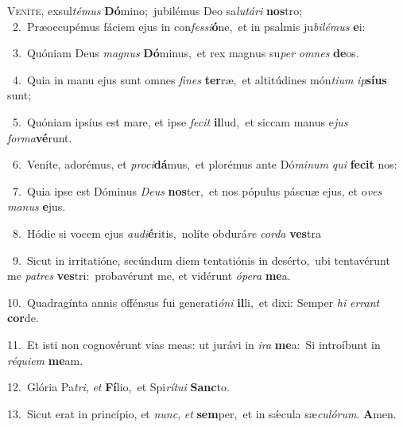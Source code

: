 \lettrine{\initial\textcolor{\initialcolor}{V}}{eníte,} exsul\-\textit{té}\-\textit{mus} \textbf{Dó}\-mino;~\star jubilémus Deo sa\-\textit{lu}\-\textit{tá}\textit{ri} \textbf{nos}\-tro;\\
{\numbfont\textcolor{\numbcolor}{~2.}}~Præoccupémus fáciem ejus in con\-\textit{fes}\-\textit{si}\textbf{ó}ne,~\star et in psalmis ju\-\textit{bi}\-\textit{lé}\textit{mus} \textbf{e}\-i:\par
{\numbfont\textcolor{\numbcolor}{~3.}}~Quóniam Deus \textit{ma}\-\textit{gnus} \textbf{Dó}\-minus,~\star et rex magnus su\textit{per} \textit{om}\-\textit{nes} \textbf{de}\-os.\par
{\numbfont\textcolor{\numbcolor}{~4.}}~Quia in manu ejus sunt omnes \textit{fi}\-\textit{nes} \textbf{ter}\-ræ,~\star et altitúdines món\-\textit{ti}\-\textit{um} \textit{ip}\-\textbf{sí}\textbf{us} sunt;\par
{\numbfont\textcolor{\numbcolor}{~5.}}~Quóniam ipsíus est mare, et ipse \textit{fe}\-\textit{cit} \textbf{il}\-lud,~\star et siccam manus e\textit{jus} \textit{for}\-\textit{ma}\textbf{vé}runt.\par
{\numbfont\textcolor{\numbcolor}{~6.}}~Veníte, adorémus, et \textit{pro}\-\textit{ci}\textbf{dá}mus,~\star et plorémus ante Dó\-\textit{mi}\-\textit{num} \textit{qui} \textbf{fe}\-\textbf{cit} nos:\par
{\numbfont\textcolor{\numbcolor}{~7.}}~Quia ipse est Dóminus \textit{De}\-\textit{us} \textbf{nos}\-ter,~\star et nos pópulus páscuæ ejus, et o\textit{ves} \textit{ma}\-\textit{nus} \textbf{e}\-jus.\par
{\numbfont\textcolor{\numbcolor}{~8.}}~Hódie si vocem ejus \textit{au}\-\textit{di}\textbf{é}ritis,~\star nolíte obdurá\textit{re} \textit{cor}\-\textit{da} \textbf{ves}\-tra\par
{\numbfont\textcolor{\numbcolor}{~9.}}~Sicut in irritatióne, secúndum diem tentatiónis in desérto,~\dagger ubi tentavérunt me \textit{pa}\-\textit{tres} \textbf{ves}\-tri:~\star probavérunt me, et vidérunt \textit{ó}\-\textit{pe}\textit{ra} \textbf{me}\-a.\par
{\numbfont\textcolor{\numbcolor}{10.}}~Quadragínta annis offénsus fui generati\-\textit{ó}\-\textit{ni} \textbf{il}\-li,~\star et dixi: Semper \textit{hi} \textit{er}\-\textit{rant} \textbf{cor}\-de.\par
{\numbfont\textcolor{\numbcolor}{11.}}~Et isti non cognovérunt vias meas: ut jurávi in \textit{i}\-\textit{ra} \textbf{me}\-a:~\star Si introíbunt in \textit{ré}\-\textit{qui}\textit{em} \textbf{me}\-am.\par
{\numbfont\textcolor{\numbcolor}{12.}}~Glória Pa\-\textit{tri}\-, \textit{et} \textbf{Fí}\-lio,~\star et Spi\-\textit{rí}\-\textit{tu}\textit{i} \textbf{Sanc}\-to.\par
{\numbfont\textcolor{\numbcolor}{13.}}~Sicut erat in princípio, et \textit{nunc}\-, \textit{et} \textbf{sem}\-per,~\star et in sǽcula sæ\-\textit{cu}\-\textit{ló}\textit{rum}. \textbf{A}\-men.\par
